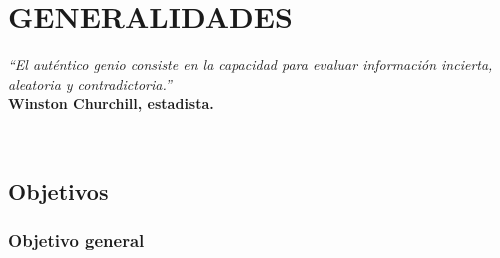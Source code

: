 \documentclass[12pt]{book} %
\begin{document}
\setcounter{tocdepth}{3}   %
\tableofcontents %

\newpage %
\thispagestyle{empty} 
	
			 
\newpage		 
\pagestyle{fancy}


	
	
	



\newpage

\chapter{GENERALIDADES}
\thispagestyle{empty}

\begin{minipage}{0.5\textwidth}
	\begin{flushleft} \large
	\scriptsize	\textsl{\large “El auténtico genio consiste en la capacidad para evaluar información incierta, 
								aleatoria y contradictoria.”}\\
	\scriptsize \textbf{Winston Churchill, estadista.}
	\end{flushleft}
\end{minipage}\\[4cm]			

\newpage
\section{Objetivos}
	\subsection{Objetivo general}
	
\end{document}
